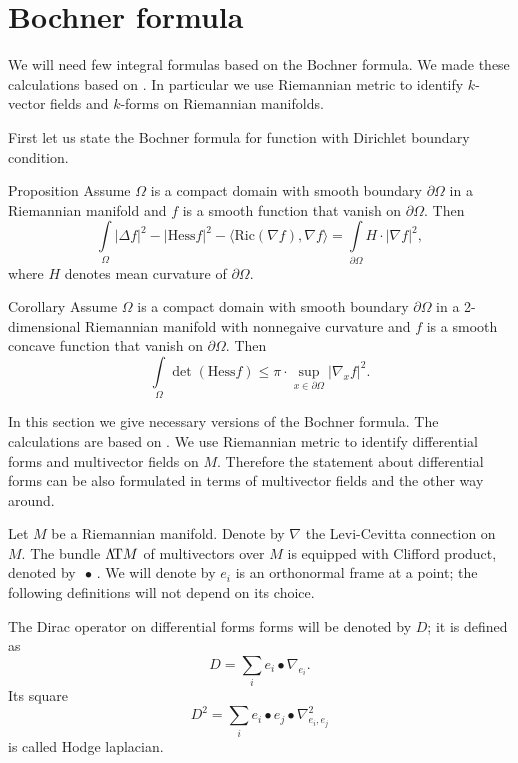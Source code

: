 \section{Bochner formula}
\label{sec:Bochner}

We will need few integral formulas based on the Bochner formula.
We made these calculations based on \cite[Chapter II]{lawson-michelsohn}.
In particular we use Riemannian metric to identify $k$-vector fields and $k$-forms on Riemannian manifolds.

First let us state the Bochner formula for function with Dirichlet boundary condition.

\begin{thm}{Proposition}\label{prop:bochner-dirichle-old}
Assume $\Omega$ is a compact domain with smooth boundary $\partial \Omega$ in a Riemannian manifold
and $f$ is a smooth function that vanish on $\partial \Omega$.
Then
\[\int\limits_\Omega |\Delta f|^2
-|\mathrm{Hess}f|^2
-\langle\mathrm{Ric}(\nabla f),\nabla f\rangle
=\int\limits_{\partial\Omega}
H\cdot|\nabla f|^2,\]
where $H$ denotes mean curvature of $\partial \Omega$.
\end{thm}
 
\begin{thm}{Corollary}
Assume $\Omega$ is a compact domain with smooth boundary $\partial \Omega$ in a 2-dimensional Riemannian manifold with nonnegaive curvature
and $f$ is a smooth concave function that vanish on $\partial \Omega$.
Then
\[\int\limits_\Omega 
\det(\mathrm{Hess}f)
\le\pi\cdot\sup_{x\in\partial\Omega}|\nabla_x f|^2.\]

\end{thm}




In this section we give necessary versions of the Bochner formula.
The calculations are based on \cite[Chapter II]{lawson-michelsohn}.
We use Riemannian metric to identify differential forms and multivector fields on $M$.
Therefore the statement about differential forms can be also formulated in terms of multivector fields and the other way around.


Let $M$ be a Riemannian manifold.
Denote by $\nabla$ the Levi-Cevitta connection on $M$.
The bundle $\Lambda\!\mathrm{T} M$ of multivectors over $M$ is equipped with Clifford product, denoted by $\,\bullet \,$.
We will denote by $e_i$ is an orthonormal frame at a point; the following definitions will not depend on its choice.

The Dirac operator on differential forms forms will be denoted by $D$;
it is defined as
\[D=\sum_i e_i\bullet \nabla_{e_i}.\]
Its square 
\[D^2=\sum_i e_i\bullet e_j\bullet \nabla^2_{e_i,e_j}\]
is called Hodge laplacian.

